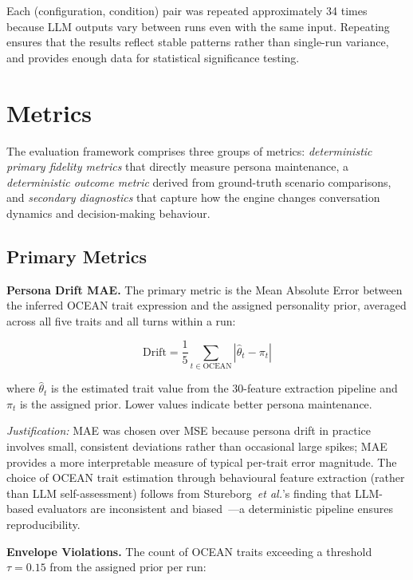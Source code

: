 \documentclass[12pt, a4paper]{report}
\newcommand{\etal}{\textit{et al.}}
\begin{document}
Each (configuration, condition) pair was repeated approximately 34 times because LLM outputs vary between runs even with the same input. Repeating ensures that the results reflect stable patterns rather than single-run variance, and provides enough data for statistical significance testing.


\section{Metrics}
\label{sec:metrics}

The evaluation framework comprises three groups of metrics: \textit{deterministic primary fidelity metrics} that directly measure persona maintenance, a \textit{deterministic outcome metric} derived from ground-truth scenario comparisons, and \textit{secondary diagnostics} that capture how the engine changes conversation dynamics and decision-making behaviour.

\subsection{Primary Metrics}

\textbf{Persona Drift MAE.} The primary metric is the Mean Absolute Error between the inferred OCEAN trait expression and the assigned personality prior, averaged across all five traits and all turns within a run:

\begin{equation}
    \text{Drift} = \frac{1}{5} \sum_{t \in \text{OCEAN}} \left| \hat{\theta}_t - \pi_t \right|
    \label{eq:drift}
\end{equation}

\noindent where $\hat{\theta}_t$ is the estimated trait value from the 30-feature extraction pipeline and $\pi_t$ is the assigned prior. Lower values indicate better persona maintenance.

\textit{Justification:} MAE was chosen over MSE because persona drift in practice involves small, consistent deviations rather than occasional large spikes; MAE provides a more interpretable measure of typical per-trait error magnitude. The choice of OCEAN trait estimation through behavioural feature extraction (rather than LLM self-assessment) follows from Stureborg~\etal's finding that LLM-based evaluators are inconsistent and biased~\cite{stureborg2024inconsistent}---a deterministic pipeline ensures reproducibility.

\textbf{Envelope Violations.} The count of OCEAN traits exceeding a threshold $\tau = 0.15$ from the assigned prior per run:
\end{document}
